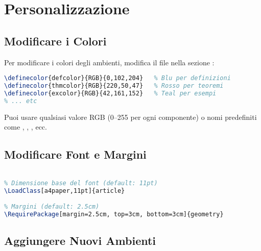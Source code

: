 \documentclass{csnotes}
\begin{document}
\section{Personalizzazione}

\subsection{Modificare i Colori}

Per modificare i colori degli ambienti, modifica il file  
nella sezione :

\begin{lstlisting}[language=TeX]
% Nel file csnotes.cls
\definecolor{defcolor}{RGB}{0,102,204}   % Blu per definizioni
\definecolor{thmcolor}{RGB}{220,50,47}   % Rosso per teoremi
\definecolor{excolor}{RGB}{42,161,152}   % Teal per esempi
% ... etc
\end{lstlisting}

\begin{note}
Puoi usare qualsiasi valore RGB (0--255 per ogni componente) o nomi predefiniti
come , , , ecc.
\end{note}

\subsection{Modificare Font e Margini}

\begin{lstlisting}[language=TeX]
% Nel file csnotes.cls

% Dimensione base del font (default: 11pt)
\LoadClass[a4paper,11pt]{article}

% Margini (default: 2.5cm)
\RequirePackage[margin=2.5cm, top=3cm, bottom=3cm]{geometry}
\end{lstlisting}

\subsection{Aggiungere Nuovi Ambienti}
\end{document}
